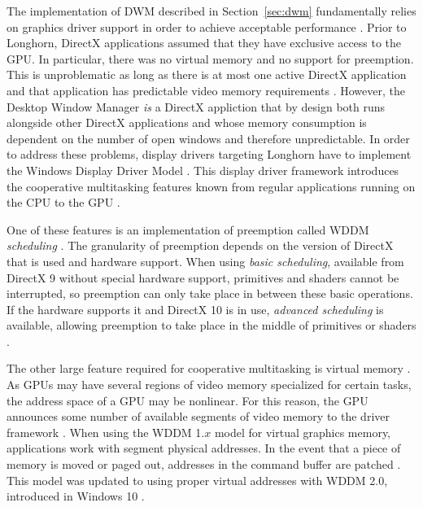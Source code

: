 		\label{sec:wddm}
			The implementation of DWM described in Section~\ref{sec:dwm}
			fundamentally relies on graphics driver support in order to achieve
			acceptable performance \cite{dwmwddm}.  Prior to Longhorn, DirectX applications
			assumed that they have exclusive access to the GPU. In particular,
			there was no virtual memory and no support for preemption. This is
			unproblematic as long as there is at most one active DirectX application
			and that application has predictable video memory requirements \cite{dwmwddm}.
			However, the Desktop Window Manager \emph{is} a DirectX appliction that
			by design both runs alongside other DirectX applications and whose
			memory consumption is dependent on the number of open windows and therefore
			unpredictable.
			In order to address these problems, display drivers targeting Longhorn
			have to implement the Windows Display Driver Model \cite{dwmalwayson}. This
			display driver framework introduces the cooperative multitasking
			features known from regular applications running on the CPU to the
			GPU \cite{dwmwddm}.

			One of these features is an implementation of preemption called
			WDDM \emph{scheduling} \cite{dwmwddm}. The granularity of preemption depends on
			the version of DirectX that is used and hardware support. When
			using \emph{basic scheduling}, available from DirectX 9 without
			special hardware support, primitives and shaders cannot be interrupted,
			so preemption can only take place in between these basic operations.
			If the hardware supports it and DirectX 10 is in use, \emph{advanced
			scheduling} is available, allowing preemption to take place in the middle
			of primitives or shaders \cite{dwmwddm}.

			The other large feature required for cooperative multitasking is
			virtual memory \cite{dwmwddm}. As GPUs may have several regions of video memory
			specialized for certain tasks, the address space of a GPU may
			be nonlinear. For this reason, the GPU announces some number of
			available segments of video memory to the driver framework \cite{gpuseg}.
			When using the WDDM 1.$x$ model for virtual graphics
			memory, applications work with segment physical addresses. In the event
			that a piece of memory is moved or paged out, addresses in the command
			buffer are patched \cite{wddm2}. This model was updated to using proper virtual
			addresses with WDDM 2.0, introduced in Windows 10 \cite{wddm2}.

